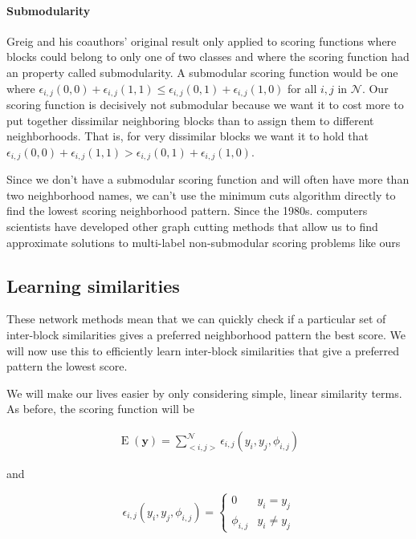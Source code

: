 \paragraph{Submodularity}
Greig and his coauthors' original result only applied to scoring
functions where blocks could belong to only one of two classes and
where the scoring function had an property called submodularity.  A
submodular scoring function would be one where $\epsilon_{i,j}(0,0) +
\epsilon_{i,j}(1,1) \leq \epsilon_{i,j}(0,1) + \epsilon_{i,j}(1,0)$
for all $i,j$ in $\mathcal{N}$. Our scoring function is decisively not
submodular because we want it to cost more to put together
dissimilar neighboring blocks than to assign them to different
neighborhoods. That is, for very dissimilar blocks we want it to hold
that $\epsilon_{i,j}(0,0) + \epsilon_{i,j}(1,1) \boldsymbol{>}
\epsilon_{i,j}(0,1) + \epsilon_{i,j}(1,0)$.

Since we don't have a submodular scoring function and will often have
more than two neighborhood names, we can't use the minimum cuts
algorithm directly to find the lowest scoring neighborhood
pattern. Since the 1980s. computers scientists have developed
other graph cutting methods that allow us to find approximate
solutions to multi-label non-submodular scoring problems like ours
\cite{kolmogorov_minimizing_2007}

\subsection{Learning similarities}
These network methods mean that we can quickly check if a particular
set of inter-block similarities gives a preferred neighborhood pattern
the best score. We will now use this to efficiently learn inter-block
similarities that give a preferred pattern the lowest score.

We will make our lives easier by only considering simple, linear
similarity terms. As before, the scoring function will be

\begin{align}
\operatorname{E}(\mathbf{y}) = \sum_{<i,j>}^{\mathcal{N}}\epsilon_{i,j}(y_i,y_j,\phi_{i,j})
\end{align}

\noindent
and

\begin{equation}
\epsilon_{i,j}(y_i,y_j,\phi_{i,j}) = \begin{cases}
  0 &y_i = y_j \\
  \phi_{i,j} &y_i \neq y_j
\end{cases}
\end{equation}


